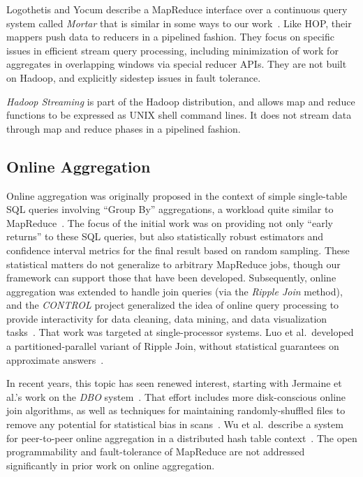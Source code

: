 Logothetis and Yocum describe a MapReduce interface over a continuous query
system called \emph{Mortar} that is similar in some ways to our
work~\cite{logoyocum08}.  Like HOP, their mappers push data to reducers in a
pipelined fashion.  They focus on specific issues in efficient stream query
processing, including minimization of work for aggregates in overlapping windows
via special reducer APIs.  They are not built on Hadoop, and explicitly sidestep
issues in fault tolerance.

\emph{Hadoop Streaming} is part of the Hadoop distribution, and allows map and
reduce functions to be expressed as UNIX shell command lines.  It does not
stream data through map and reduce phases in a pipelined fashion.

\subsection{Online Aggregation}
Online aggregation was originally proposed in the context of simple single-table
SQL queries involving ``Group By'' aggregations, a workload quite similar to
MapReduce~\cite{onlineagg}.  The focus of the initial work was on providing not
only ``early returns'' to these SQL queries, but also statistically robust
estimators and confidence interval metrics for the final result based on random
sampling.  These statistical matters do not generalize to arbitrary MapReduce
jobs, though our framework can support those that have been developed.
Subsequently, online aggregation was extended to handle join queries (via the
\emph{Ripple Join} method), and the \emph{CONTROL} project generalized the idea
of online query processing to provide interactivity for data cleaning, data
mining, and data visualization tasks~\cite{ieeecontrol}.  That work was targeted
at single-processor systems.  Luo et al.\ developed a partitioned-parallel
variant of Ripple Join, without statistical guarantees on approximate
answers~\cite{luo-ripple}.

In recent years, this topic has seen renewed interest, starting with Jermaine et
al.'s work on the \emph{DBO} system~\cite{dbo}.  That effort includes more
disk-conscious online join algorithms, as well as techniques for maintaining
randomly-shuffled files to remove any potential for statistical bias in
scans~\cite{jermaine-shuffle}.  Wu et al.\ describe a system for peer-to-peer
online aggregation in a distributed hash table context~\cite{wu-vldb09}.  The
open programmability and fault-tolerance of MapReduce are not addressed
significantly in prior work on online aggregation.

